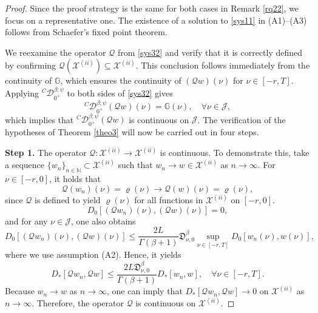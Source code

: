 \documentclass[reqno]{amsart}
\begin{document}
\begin{proof}
Since the proof strategy is the same for both cases in Remark \ref{rq22}, 
we focus on a representative one. 
The existence of a solution to \eqref{sys11} in (A1)--(A3) follows from 
Schaefer's fixed point theorem.

We reexamine the operator $\mathcal{Q}$ from \eqref{sys32} and verify that it is 
correctly defined by confirming 
$\mathcal{Q}(\mathcal{X}^{(ii)}) \subseteq \mathcal{X}^{(ii)}$. 
This conclusion follows immediately from the continuity of $\mathbb{G}$, which ensures 
the continuity of $(\mathcal{Q} w)(\nu )$ for $\nu \in [- r, T]$.
Applying \({}^C \mathcal{D}_{0^{+}}^{\beta ; \psi}\) to both sides of \eqref{sys32} gives
\[
{}^C \mathcal{D}_{0^{+}}^{\beta ; \psi}(\mathcal{Q} w)(\nu ) 
= \mathbb{G}(\nu ), \quad \forall \nu \in \mathcal{J},
\]
which implies that \({}^C \mathcal{D}_{0^{+}}^{\beta ; \psi}(\mathcal{Q} w)\) 
is continuous on \(\mathcal{J}\).
The verification of the hypotheses of Theorem \ref{theo3} will now be carried out 
in four  steps.
\smallskip

\noindent\textbf{Step 1.} The operator \(\mathcal{Q} : \mathcal{X}^{(ii)} 
\to \mathcal{X}^{(ii)}\) is continuous. To demonstrate this, take a sequence 
\(\{ w_n\}_{n \in \mathbb{N}} \subset \mathcal{X}^{(ii)}\) such that
 \( w_n \to w \in \mathcal{X}^{(ii)}\) as 
\(n \to \infty\). For \( \nu \in [- r, 0] \), it holds that
\[
\mathcal{Q}( w_n)(\nu ) = \varrho(\nu ) \to \mathcal{Q}( w)(\nu ) = \varrho(\nu ),
\]
since \(\mathcal{Q}\) is defined to yield \(\varrho(\nu )\) for all functions 
in \(\mathcal{X}^{(ii)}\) on \([- r, 0]\).
$$
D_0[(\mathcal{Q} w_{n})(\nu ),(\mathcal{Q} w)(\nu )]=0,
$$
and for any $\nu \in\mathcal{J}$, one also obtains
$$
D_0[(\mathcal{Q} w_{n})(\nu ),(\mathcal{Q} w)(\nu )]
\leq  \frac{2L}{\Gamma(\beta+1)}\mathfrak{D}_{\nu ,0}^{\beta} \sup _{\nu \in[- r, T]} D_0[ w_{n}(\nu ), w(\nu )],
$$
where we use assumption (A2). Hence, it yields
$$
D_{*}[\mathcal{Q} w_{n}, \mathcal{Q} w] 
\leq \frac{2L\mathfrak{D}_{\nu ,0}^{\beta} }{\Gamma(\beta+1)}D_{*}[ w_{n}, w], 
\quad \forall \nu \in[- r, T] .
$$
Because $ w_{n} \to w$ as $n \to \infty$, one can imply that 
$D_{*}[\mathcal{Q} w_{n}, \mathcal{Q} w] \to 0$ on $\mathcal{X}^{(ii)}$ as 
$n \to \infty$. Therefore, the operator $\mathcal{Q}$ is continuous on 
$\mathcal{X}^{(ii)}$.
\smallskip


\end{proof}
\end{document}
